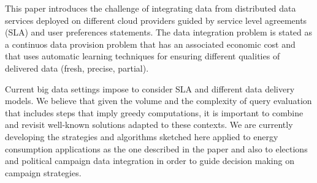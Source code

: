 This paper introduces the challenge of integrating data from distributed data services deployed on different cloud providers guided by service level agreements (SLA) and user preferences statements. The data integration problem is stated as a continuos data provision problem that has an associated economic cost and that uses automatic learning techniques for ensuring different qualities of delivered data (fresh, precise, partial).

Current big data settings impose  to consider SLA and different data delivery models. We believe that given the volume and the complexity of query evaluation that includes steps that imply greedy computations, it is important to combine and revisit well-known solutions  adapted to these contexts. We are currently developing the strategies and algorithms sketched here applied to energy consumption applications as the one described in the paper and also to elections and political campaign data integration in order to guide decision making on campaign strategies.

